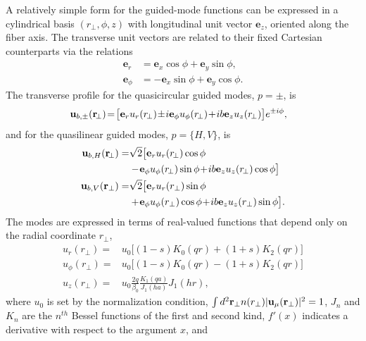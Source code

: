 \documentclass[aps,pra,twocolumn]{revtex4-1} %
\begin{document}
\begin{appendix}
A relatively simple form for the guided-mode functions can be expressed in a cylindrical basis $(r_\perp, \phi, z)$ with longitudinal unit vector $\mathbf{e}_z$, oriented along the fiber axis.  
The transverse unit vectors are related to their fixed Cartesian counterparts via the relations
	\begin{align}
		\mathbf{e}_r     &= \mathbf{e}_x \cos \phi + \mathbf{e}_y \sin \phi, \\
		\mathbf{e}_\phi &= - \mathbf{e}_x \sin \phi + \mathbf{e}_y \cos \phi.
	\end{align}
The transverse profile for the quasicircular guided modes, $p = \pm$, is
	\begin{align} \label{Eq::QuasicircularModes}
		\!\!\!\!\!\mbf{u}_{b,\pm}(\mathbf{r}\!_\perp) \!=\! \big[\mathbf{e}_r u_r(r\!_\perp) \!\pm\! i \mathbf{e}_\phi u_\phi(r\!_\perp) \!+\!  i b \mathbf{e}_z  u_z(r\!_\perp) \big]e^{ \pm i \phi}, 
	\end{align}
and for the quasilinear guided modes, $p = \{H,V\}$, is
	\begin{subequations} \label{Eq::QuasilinearModes}
	\begin{align}
		\mbf{u}_{b,H}(\mathbf{r}\!_\perp) = & \sqrt{2} \big[ \mathbf{e}_r u_r(r\!_\perp) \cos \phi \nn\\
		&-\! \mathbf{e}_\phi u_\phi(r\!_\perp) \sin \phi \!+\!  ib \mathbf{e}_z  u_z(r\!_\perp) \cos \phi \big] \\
		\mbf{u}_{b,V}(\mathbf{r}_\perp) = & \sqrt{2} \big[ \mathbf{e}_r u_r(r_\perp) \sin \phi \nn\\
		&+\! \mathbf{e}_\phi u_\phi(r_\perp) \cos \phi \!+\!  ib \mathbf{e}_z  u_z(r_\perp) \sin \phi \big]. 
	\end{align}
	\end{subequations}
The modes are expressed in terms of real-valued functions that depend only on the radial coordinate $r_\perp$,
	\begin{subequations} \label{Eq::ProfileFunctions}
	\begin{align} 
		u_r(r_\perp) =& u_0 \big[ (1-s) K_0(qr) + (1+s)K_2(qr)\big] \\
		u_\phi(r_\perp) =& u_0\big[ (1-s) K_0(qr) - (1+s)K_2(qr)\big] \\
		u_z(r_\perp) =& u_0 \frac{2 q}{\beta_0} \frac{K_1(qa)}{J_1(ha)} J_1(hr), \label{Eq::zprofile}
	\end{align}
	\end{subequations}
where $u_0$ is set by the normalization condition, $\int d^2 \mathbf{r}_\perp n(r_\perp) | \mathbf{u}_\mu(\mathbf{r}_\perp)|^2=1$, $J_n$ and $K_n$ are the $n^{th}$ Bessel functions of the first and second kind, $f'(x)$ indicates a derivative with respect to the argument $x$, and 

\end{appendix}
\end{document}

